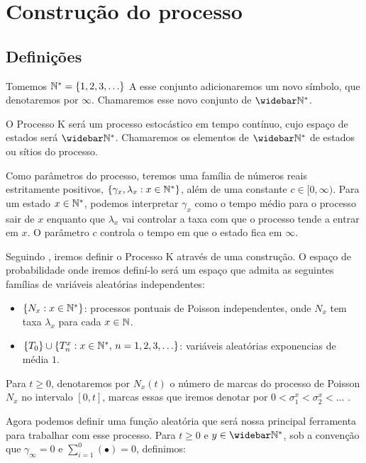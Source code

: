 \chapter{Construção do processo}
\label{cap:construcao}

\section{Definições}
\label{sec:definicoes}

Tomemos ${\mathbb{N^*}} = \{ 1, 2, 3, \ldots\}$ A esse conjunto adicionaremos um
novo símbolo, que denotaremos por $\infty$. Chamaremos esse novo
conjunto de $\Nzb$.

O Processo K será um processo estocástico em tempo contínuo, cujo
espaço de estados será $\Nzb$. Chamaremos os elementos de $\Nzb$ de
estados ou sítios do processo.

Como parâmetros do processo, teremos uma família de números reais
estritamente positivos, $\{\gamma_x, \lambda_x : x \in {\mathbb{N^*}}\}$, além de
uma constante $c \in [0, \infty)$.  Para um estado $x \in {\mathbb{N^*}}$,
podemos interpretar $\gamma_x$ como o tempo médio para o processo sair
de $x$ enquanto que $\lambda_x$ vai controlar a taxa com que o
processo tende a entrar em $x$. O parâmetro $c$ controla o tempo em
que o estado fica em $\infty$.

Seguindo \cite{fontes:08}, iremos definir o Processo K através de uma
construção. O espaço de probabilidade onde iremos definí-lo será um
espaço que admita as seguintes famílias de variáveis aleatórias
independentes:

\begin{itemize}
\item $\{ N_x: x \in {\mathbb{N^*}} \}$: processos pontuais de Poisson
  independentes, onde $N_x$ tem taxa $\lambda_x$ para cada $x \in {\mathbb{N}}$.
\item $\{T_0\} \cup \{T_n^x: x \in {\mathbb{N^*}} , \, n = 1, 2, 3, \ldots \}$:
  variáveis aleatórias exponencias de média $1$.
\end{itemize}

Para $t \geq 0$, denotaremos por $N_x(t)$ o número de marcas do
processo de Poisson $N_x$ no intervalo $[0, t]$, marcas essas que
iremos denotar por $0 < \sigma_1^x < \sigma_2^x < \ldots$ .

Agora podemos definir uma função aleatória que será nossa principal
ferramenta para trabalhar com esse processo. Para $t \geq 0$ e $y \in
\Nzb$, sob a convenção que $\gamma_\infty = 0$ e $\sum_{i=1}^{0}(
\bullet ) = 0$, definimos:

